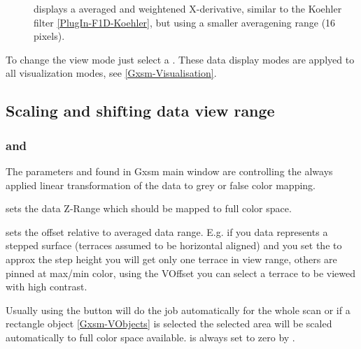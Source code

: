 \begin{description}
\item[] displays a averaged and weightened
  X-derivative, similar to the Koehler filter
  \ref{PlugIn-F1D-Koehler}, but using a smaller averagening range (16
  pixels).

\end{description}
To change the view mode just select a .  These data display
modes are applyed to all visualization modes, see
\ref{Gxsm-Visualisation}.

\subsection{Scaling and shifting data view range}
\label{display-dialog}

\subsubsection{ and }
\label{bright-contrast}

The parameters  and  found in Gxsm
main window are controlling the always applied linear
transformation of the data to grey or false color mapping.

 sets the data Z-Range which should be mapped to full color space.

 sets the offset relative to averaged data range. E.g.
if you data represents a stepped surface (terraces assumed to be
horizontal aligned) and you set the  to approx the step
height you will get only one terrace in view range, others are pinned
at max/min color, using the VOffset you can select a terrace to be
viewed with high contrast.

Usually using the  button will do the job automatically
for the whole scan or if a rectangle object \ref{Gxsm-VObjects}
is selected the selected area will be scaled automatically to full
color space available.
 is always set to zero by .


